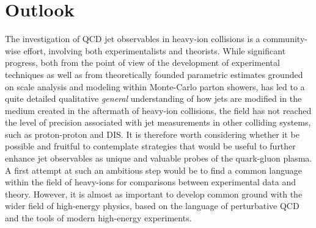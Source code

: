 
\section{Outlook}
\label{sec:outlook}

The investigation of QCD jet observables in heavy-ion collisions is a community-wise effort, involving both experimentalists and theorists. 
While significant progress, both from the point of view of the development of experimental techniques as well as from theoretically founded parametric estimates grounded on scale analysis and modeling within Monte-Carlo parton showers, has led to a quite detailed qualitative \textsl{general} understanding of how jets are modified in the medium created in the aftermath of heavy-ion collisions, the field has not reached the level of precision associated with jet measurements in other colliding systems, such as proton-proton and DIS.
It is therefore worth considering whether it be possible and fruitful to contemplate strategies that would be useful to further enhance jet observables as unique and valuable probes of the quark-gluon plasma.
A first attempt at such an ambitious step would be to find a common language within the field of heavy-ions for comparisons between experimental data and theory. However, it is almost as important to develop common ground with the wider field of high-energy physics, based on the language of perturbative QCD and the tools of modern high-energy experiments.

